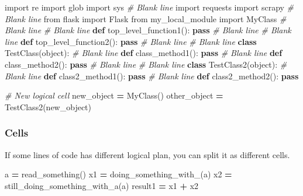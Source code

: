 \documentclass[
]{book}
\newenvironment{Shaded}{\begin{snugshade}}{\end{snugshade}}
\newcommand{\BuiltInTok}[1]{#1}
\newcommand{\CommentTok}[1]{\textcolor[rgb]{0.56,0.35,0.01}{\textit{#1}}}
\newcommand{\ControlFlowTok}[1]{\textcolor[rgb]{0.13,0.29,0.53}{\textbf{#1}}}
\newcommand{\ImportTok}[1]{#1}
\newcommand{\KeywordTok}[1]{\textcolor[rgb]{0.13,0.29,0.53}{\textbf{#1}}}
\newcommand{\NormalTok}[1]{#1}
\newcommand{\OperatorTok}[1]{\textcolor[rgb]{0.81,0.36,0.00}{\textbf{#1}}}
\begin{document}
\begin{Shaded}
\begin{Highlighting}[]
\ImportTok{import}\NormalTok{ re}
\ImportTok{import}\NormalTok{ glob}
\ImportTok{import}\NormalTok{ sys}
\CommentTok{\# Blank line}
\ImportTok{import}\NormalTok{ requests}
\ImportTok{import}\NormalTok{ scrapy}
\CommentTok{\# Blank line}
\ImportTok{from}\NormalTok{ flask }\ImportTok{import}\NormalTok{ Flask}
\ImportTok{from}\NormalTok{ my\_local\_module }\ImportTok{import}\NormalTok{ MyClass}
\CommentTok{\# Blank line}
\CommentTok{\# Blank line}
\KeywordTok{def}\NormalTok{ top\_level\_function1():}
    \ControlFlowTok{pass}
\CommentTok{\# Blank line}
\CommentTok{\# Blank line}
\KeywordTok{def}\NormalTok{ top\_level\_function2():}
    \ControlFlowTok{pass}
\CommentTok{\# Blank line}
\CommentTok{\# Blank line}
\KeywordTok{class}\NormalTok{ TestClass(}\BuiltInTok{object}\NormalTok{):}
    \CommentTok{\# Blank line}
    \KeywordTok{def}\NormalTok{ class\_method1():}
        \ControlFlowTok{pass}
    \CommentTok{\# Blank line}
    \KeywordTok{def}\NormalTok{ class\_method2():}
        \ControlFlowTok{pass}
\CommentTok{\# Blank line}
\CommentTok{\# Blank line}
\KeywordTok{class}\NormalTok{ TestClass2(}\BuiltInTok{object}\NormalTok{):}
    \CommentTok{\# Blank line}
    \KeywordTok{def}\NormalTok{ class2\_method1():}
        \ControlFlowTok{pass}
    \CommentTok{\# Blank line    }
    \KeywordTok{def}\NormalTok{ class2\_method2():}
        \ControlFlowTok{pass}
\end{Highlighting}
\end{Shaded}

\begin{Shaded}
\begin{Highlighting}[]
\CommentTok{\# New logical cell }
\NormalTok{new\_object }\OperatorTok{=}\NormalTok{ MyClass()}
\NormalTok{other\_object }\OperatorTok{=}\NormalTok{ TestClass2(new\_object)}
\end{Highlighting}
\end{Shaded}

\hypertarget{cells}{%
\subsubsection{Cells}\label{cells}}

If some lines of code has different logical plan, you can split it as different cells.

\begin{Shaded}
\begin{Highlighting}[]
\NormalTok{a }\OperatorTok{=}\NormalTok{ read\_something()}
\NormalTok{x1 }\OperatorTok{=}\NormalTok{ doing\_something\_with\_(a)}
\NormalTok{x2 }\OperatorTok{=}\NormalTok{ still\_doing\_something\_with\_a(a)}
\NormalTok{result1 }\OperatorTok{=}\NormalTok{ x1 }\OperatorTok{+}\NormalTok{ x2}
\end{Highlighting}
\end{Shaded}
\end{document}
